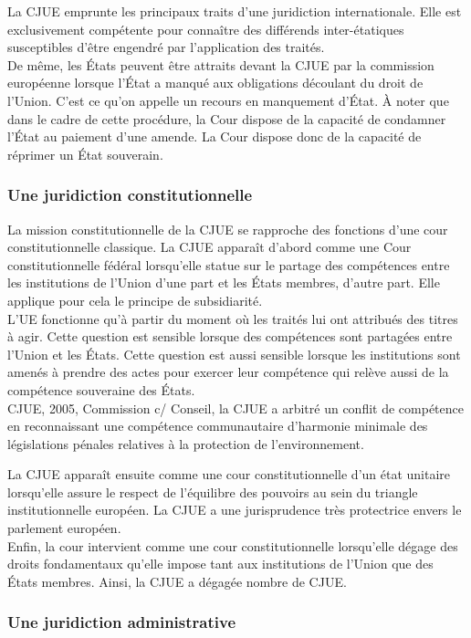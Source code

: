 \documentclass[10pt, a4paper, openany]{book}
\begin{document}
La CJUE emprunte les principaux traits d'une juridiction internationale. Elle est exclusivement compétente pour connaître des différends inter-étatiques susceptibles d'être engendré par l'application des traités. \\
De même, les États peuvent être attraits devant la CJUE par la commission européenne lorsque l'État a manqué aux obligations découlant du droit de l'Union. C'est ce qu'on appelle un recours en manquement d'État. À noter que dans le cadre de cette procédure, la Cour dispose de la capacité de condamner l'État au paiement d'une amende. La Cour dispose donc de la capacité de réprimer un État souverain. 

\subsubsection{Une juridiction constitutionnelle}

La mission constitutionnelle de la CJUE se rapproche des fonctions d'une cour constitutionnelle classique. La CJUE apparaît d'abord comme une Cour constitutionnelle fédéral lorsqu'elle statue sur le partage des compétences entre les institutions de l'Union d'une part et les États membres, d'autre part. Elle applique pour cela le principe de subsidiarité. \\
L'UE fonctionne qu'à partir du moment où les traités lui ont attribués des titres à agir. Cette question est sensible lorsque des compétences sont partagées entre l'Union et les États. Cette question est aussi sensible lorsque les institutions sont amenés à prendre des actes pour exercer leur compétence qui relève aussi de la compétence souveraine des États. \\
CJUE, 2005, Commission c/ Conseil, la CJUE a arbitré un conflit de compétence en reconnaissant une compétence communautaire d'harmonie minimale des législations pénales relatives à la protection de l'environnement. 


La CJUE apparaît ensuite comme une cour constitutionnelle d'un état unitaire lorsqu'elle assure le respect de l'équilibre des pouvoirs au sein du triangle institutionnelle européen. La CJUE a une jurisprudence très protectrice envers le parlement européen. \\
Enfin, la cour intervient comme une cour constitutionnelle lorsqu'elle dégage des droits fondamentaux qu'elle impose tant aux institutions de l'Union que des États membres. Ainsi, la CJUE a dégagée nombre de CJUE.

\subsubsection{Une juridiction administrative}
\end{document}

